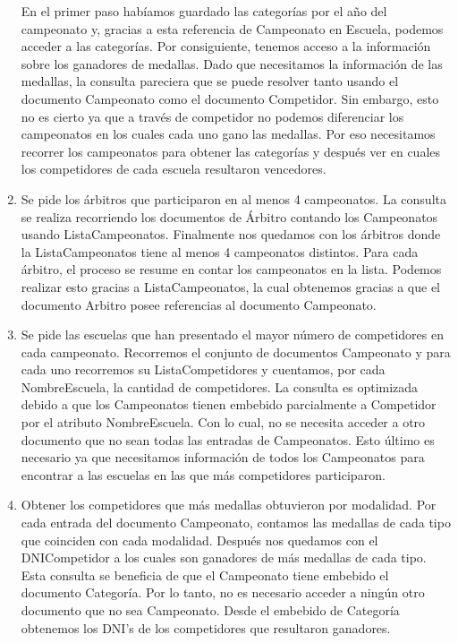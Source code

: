 \begin{enumerate}
  En el primer paso habíamos guardado las categorías por el año del campeonato y,
  gracias a esta referencia de Campeonato en Escuela, podemos acceder a las categorías. Por consiguiente, tenemos acceso a la
  información sobre los ganadores de medallas. Dado que necesitamos la información de las medallas, la consulta pareciera que
  se puede resolver tanto usando el documento Campeonato como el documento Competidor. Sin embargo, esto no es cierto ya que
  a través de competidor no podemos diferenciar los campeonatos en los cuales cada uno gano las medallas. Por eso necesitamos recorrer
  los campeonatos para obtener las categorías y después ver en cuales los competidores de cada escuela resultaron vencedores.

  \item Se pide los árbitros que participaron en al menos 4 campeonatos. La consulta se realiza recorriendo los documentos
  de Árbitro contando los Campeonatos usando ListaCampeonatos. Finalmente nos quedamos con los árbitros donde la ListaCampeonatos
  tiene al menos 4 campeonatos distintos. Para cada árbitro, el proceso se resume en contar los campeonatos en la lista.
  Podemos realizar esto gracias a ListaCampeonatos, la cual obtenemos gracias a que el documento Arbitro posee referencias
  al documento Campeonato.

  \item Se pide las escuelas que han presentado el mayor número de competidores en cada campeonato. Recorremos el conjunto de documentos
  Campeonato y para cada uno recorremos su ListaCompetidores y cuentamos, por cada NombreEscuela, la cantidad de competidores.
  La consulta es optimizada debido a que los Campeonatos tienen embebido parcialmente a Competidor por el atributo
  NombreEscuela. Con lo cual, no se necesita acceder a otro documento que no sean todas las entradas de Campeonatos.
  Esto último es necesario ya que necesitamos información de todos los Campeonatos para encontrar a las escuelas en las
  que más competidores participaron.

  \item Obtener los competidores que más medallas obtuvieron por modalidad. Por cada entrada del documento Campeonato,
  contamos las medallas de cada tipo que coinciden con cada modalidad. Después nos quedamos con el DNICompetidor a los cuales
  son ganadores de más medallas de cada tipo. Esta consulta se beneficia de que el Campeonato tiene embebido
  el documento Categoría. Por lo tanto, no es necesario acceder a ningún otro documento que no sea Campeonato. Desde el embebido
  de Categoría obtenemos los DNI's de los competidores que resultaron ganadores.

\end{enumerate}

